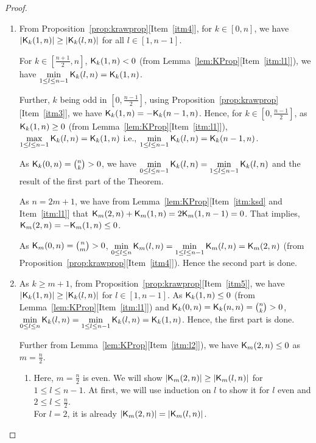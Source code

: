 \documentclass{llncs}
\begin{document}
\begin{proof}
\begin{enumerate}
\item 
From Proposition~\ref{prop:krawprop}[Item~\ref{itm4}], for $k \in [0,n]$,  we have $|\mathsf{K}_{k}(1,n)| \geq |\mathsf{K}_{k}(l,n)|$ for all $l \in [1, n-1]$.

For $k \in [\frac{n+1}{2}, n]$, $\mathsf{K}_{k}(1,n) < 0$ (from Lemma~\ref{lem:KProp}[Item~\ref{itm:l1}]), we have $\min\limits_{1 \leq l \leq n-1 }\mathsf{K}_{k}(l,n) = \mathsf{K}_{k}(1,n)$. 

Further, $k$ being odd in $[0,\frac{n-1}{2}]$, using Proposition~\ref{prop:krawprop}[Item~\ref{itm3}], we have $\mathsf{K}_{k}(1,n) = - \mathsf{K}_{k}(n-1,n)$.
Hence, for $k \in [0,\frac{n-1}{2}]$, as $\mathsf{K}_{k}(1,n) \geq 0$ (from Lemma~\ref{lem:KProp}[Item~\ref{itm:l1}]), $\max\limits_{1 \leq l \leq n-1 }\mathsf{K}_{k}(l,n) = \mathsf{K}_{k}(1,n)$ i.e., $\min\limits_{1 \leq l \leq n-1 }\mathsf{K}_{k}(l,n) = \mathsf{K}_{k}(n-1,n)$.

As $\mathsf{K}_{k}(0,n) = {n \choose k} > 0$, we have $\min\limits_{0 \leq l \leq n-1 }\mathsf{K}_{k}(l,n) = \min\limits_{1 \leq l \leq n-1 }\mathsf{K}_{k}(l,n)$ and the result of the first part of the Theorem.

As $n = 2m+1$, we have from Lemma~\ref{lem:KProp}[Item~\ref{itm:ksd} and Item~\ref{itm:l1}] that $\mathsf{K}_{m}(2,n)+\mathsf{K}_{m}(1,n) = 2\mathsf{K}_{m}(1,n-1) = 0$. That implies, $\mathsf{K}_{m}(2,n) = -\mathsf{K}_{m}(1,n) \leq 0$.

As $\mathsf{K}_{m}(0,n) = {n \choose m} > 0$, $\min\limits_{0 \leq l \leq n }\mathsf{K}_{m}(l,n) = \min\limits_{1 \leq l \leq n-1 }\mathsf{K}_{m}(l,n) = \mathsf{K}_{m}(2,n)$ (from Proposition~\ref{prop:krawprop}[Item~\ref{itm4}]). Hence the second part is done.

\item As $k \geq m+1$, from Proposition~\ref{prop:krawprop}[Item~\ref{itm5}], we have $|\mathsf{K}_{k}(1,n)| \geq |\mathsf{K}_{k}(l,n)|$ for $l \in [1,n-1]$. As $\mathsf{K}_{k}(1,n) \leq 0$ (from Lemma~\ref{lem:KProp}[Item~\ref{itm:l1}]) and $\mathsf{K}_{k}(0,n) = \mathsf{K}_{k}(n,n) = {n \choose k} > 0$, $\min\limits_{0 \leq l \leq n }\mathsf{K}_{k}(l,n) = \min\limits_{1 \leq l \leq n-1 }\mathsf{K}_{k}(l,n) = \mathsf{K}_{k}(1,n)$. Hence, the first part is done.

Further from Lemma~\ref{lem:KProp}[Item~\ref{itm:l2}]), we have 
$\mathsf{K}_{m}(2,n) \leq 0$ as $m = \frac{n}{2}$.

\begin{enumerate}
\item Here, $m = \frac{n}{2}$ is even. We will show $|\mathsf{K}_{m}(2,n)| \geq |\mathsf{K}_{m}(l,n)|$ for $1 \leq l \leq n-1$. At first, we will use induction on $l$ to show it for $l$ even and $2 \leq l \leq \frac{n}{2}$.\\
For $l = 2$, it is already $|\mathsf{K}_{m}(2,n)| = |\mathsf{K}_{m}(l,n)|$.


\end{enumerate}
\end{enumerate}
\end{proof}
\end{document}
